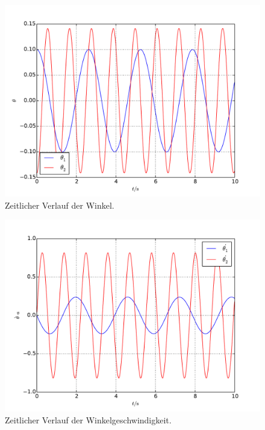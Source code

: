 \begin{figure}[h!]
	\includegraphics[width = \textwidth]{../Plots/Plot_1_C_winkel.pdf}
	\caption{Zeitlicher Verlauf der Winkel.\label{fig:winkel}}
\end{figure}

\begin{figure}[h!]
	\includegraphics[width = \textwidth]{../Plots/Plot_1_C_winkelgeschwindigkeit.pdf}
	\caption{Zeitlicher Verlauf der Winkelgeschwindigkeit.\label{fig:winkelgeschwindigkeit}}
\end{figure}

